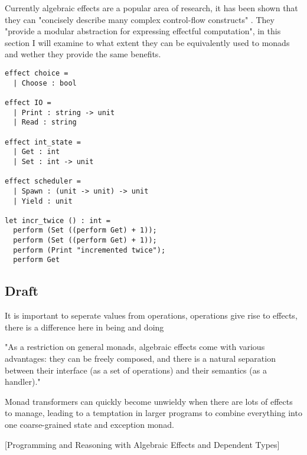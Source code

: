 \documentclass[a4paper,10pt]{article}
\theoremstyle{definition}
\begin{document}
Currently algebraic effects are a popular area of research,
it has been shown that they can "concisely describe many complex control-flow constructs" \cite{leijen2017type}.
They "provide a modular abstraction for expressing effectful computation"\cite{dolan2015effective},
in this section I will examine to what extent they can be equivalently used to monads and wether
they provide the same benefits.

\begin{verbatim}
effect choice =
  | Choose : bool

effect IO =
  | Print : string -> unit
  | Read : string

effect int_state =
  | Get : int
  | Set : int -> unit

effect scheduler =
  | Spawn : (unit -> unit) -> unit
  | Yield : unit

let incr_twice () : int =
  perform (Set ((perform Get) + 1));
  perform (Set ((perform Get) + 1));
  perform (Print "incremented twice");
  perform Get
\end{verbatim}

\subsection{Draft}

It is important to seperate values from operations, operations give rise to effects,
there is a difference here in being and doing

"As a restriction on general monads, algebraic effects come with various advantages:
they can be freely composed, 
and there is a natural separation between their interface (as a set of operations) and their semantics (as a handler)."


Monad transformers can quickly become unwieldy when there are lots of effects to manage, leading to a temptation in larger programs to combine everything into one coarse-grained state and exception monad.

[Programming and Reasoning with Algebraic Effects and Dependent Types]
\end{document}

